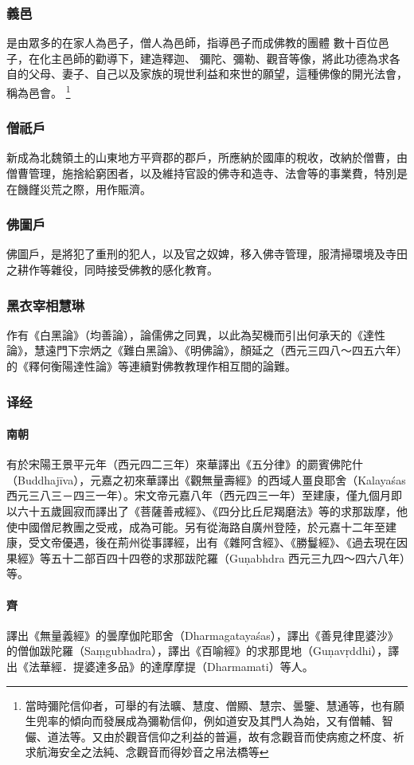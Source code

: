 \subsubsection{義邑}
是由眾多的在家人為邑子，僧人為邑師，指導邑子而成佛教的團體
數十百位邑子，在化主邑師的勸導下，建造釋迦、 彌陀、彌勒、觀音等像，將此功德為求各自的父母、妻子、自己以及家族的現世利益和來世的願望，這種佛像的開光法會，稱為邑會。
\footnote{當時彌陀信仰者，可舉的有法曠、慧度、僧顯、慧宗、曇鑒、慧通等，也有願生兜率的傾向而發展成為彌勒信仰，例如道安及其門人為始，又有僧輔、智儼、道法等。又由於觀音信仰之利益的普遍，故有念觀音而使病癒之杯度、祈求航海安全之法純、念觀音而得妙音之帛法橋等}
\subsubsection{僧祇戶}
新成為北魏領土的山東地方平齊郡的郡戶，所應納於國庫的稅收，改納於僧曹，由僧曹管理，施捨給窮困者，以及維持官設的佛寺和造寺、法會等的事業費，特別是在饑饉災荒之際，用作賑濟。
\subsubsection{佛圖戶}
佛圖戶，是將犯了重刑的犯人，以及官之奴婢，移入佛寺管理，服清掃環境及寺田之耕作等雜役，同時接受佛教的感化教育。
\subsubsection{黑衣宰相慧琳}
作有《白黑論》（均善論），論儒佛之同異，以此為契機而引出何承天的《達性論》，慧遠門下宗炳之《難白黑論》、《明佛論》，顏延之（西元三四八～四五六年）的《釋何衡陽達性論》等連續對佛教教理作相互間的論難。
\subsubsection{译经}
\paragraph{南朝}
有於宋陽王景平元年（西元四二三年）來華譯出《五分律》的罽賓佛陀什（Buddhajīva），元嘉之初來華譯出《觀無量壽經》的西域人畺良耶舍（Kalayaśas 西元三八三－四三一年）。宋文帝元嘉八年（西元四三一年）至建康，僅九個月即以六十五歲圓寂而譯出了《菩薩善戒經》、《四分比丘尼羯磨法》等的求那跋摩，他使中國僧尼教團之受戒，成為可能。另有從海路自廣州登陸，於元嘉十二年至建康，受文帝優遇，後在荊州從事譯經，出有《雜阿含經》、《勝鬘經》、《過去現在因果經》等五十二部百四十四卷的求那跋陀羅（Guṇabhdra 西元三九四～四六八年）等。
\paragraph{齊}
譯出《無量義經》的曇摩伽陀耶舍（Dharmagatayaśas），譯出《善見律毘婆沙》的僧伽跋陀羅（Saṃgubhadra），譯出《百喻經》的求那毘地（Guṇavṛddhi），譯出《法華經．提婆達多品》的達摩摩提（Dharmamati）等人。
